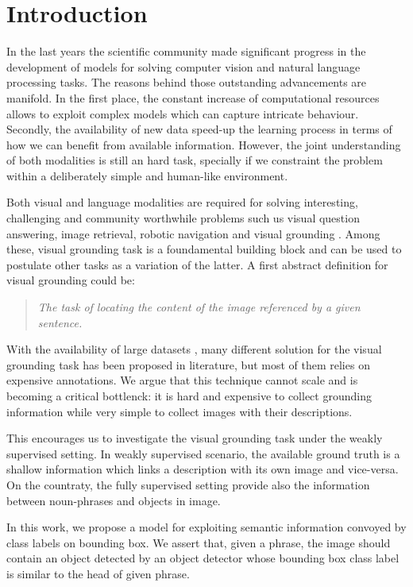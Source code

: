 \chapter{Introduction}
\label{introduction}

In the last years the scientific community made significant progress
in the development of models for solving computer vision and natural
language processing tasks. The reasons behind those outstanding
advancements are manifold. In the first place, the constant increase
of computational resources allows to exploit complex models which can
capture intricate behaviour. Secondly, the availability of new data
speed-up the learning process in terms of how we can benefit from
available information. However, the joint understanding of both
modalities is still an hard task, specially if we constraint the
problem within a deliberately simple and human-like environment.

Both visual and language modalities are required for solving
interesting, challenging and community worthwhile problems such us
visual question answering, image retrieval, robotic navigation and
visual grounding . Among these, visual grounding
task is a foundamental building block and can be used to postulate
other tasks as a variation of the latter. A first abstract definition
for visual grounding could be:

\begin{quote}
    \textit{The task of locating the content of the image referenced
    by a given sentence.}
\end{quote}

With the availability of large datasets ,
many different solution for the visual grounding task has been
proposed in literature, but most of them relies on expensive
annotations. We argue that this technique cannot scale and is becoming
a critical bottlenck: it is hard and expensive to collect grounding
information while very simple to collect images with their
descriptions.

This encourages us to investigate the visual grounding task under the
weakly supervised setting. In weakly supervised scenario, the
available ground truth is a shallow information which links a
description with its own image and vice-versa. On the countraty, the
fully supervised setting provide also the information between
noun-phrases and objects in image.

In this work, we propose a model for exploiting semantic information
convoyed by class labels on bounding box. We assert that, given a
phrase, the image should contain an object detected by an object
detector whose bounding box class label is similar to the head of
given phrase. 
